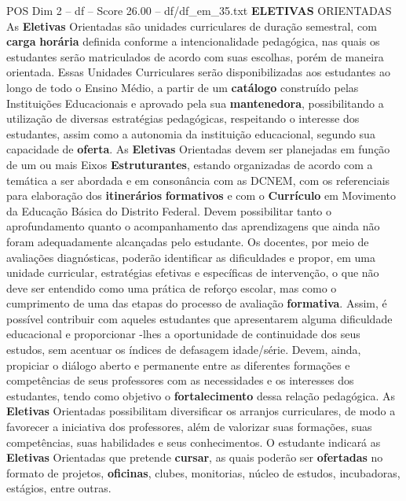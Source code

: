 \begin{textsample}{POS Dim 2 – df – Score 26.00 – df/df\_em\_35.txt}  \label{ex:f2_pos_122}
\textbf{ELETIVAS} ORIENTADAS As \textbf{Eletivas} Orientadas são unidades curriculares de duração semestral, com \textbf{carga} \textbf{horária} definida conforme a intencionalidade pedagógica, nas quais os estudantes serão matriculados de acordo com suas escolhas, porém de maneira orientada.
Essas Unidades Curriculares serão disponibilizadas aos estudantes ao longo de todo o Ensino Médio, a partir de um \textbf{catálogo} construído pelas Instituições Educacionais e aprovado pela sua \textbf{mantenedora}, possibilitando a utilização de diversas estratégias pedagógicas, respeitando o interesse dos estudantes, assim como a autonomia da instituição educacional, segundo sua capacidade de \textbf{oferta}.
As \textbf{Eletivas} Orientadas devem ser planejadas em função de um ou mais Eixos \textbf{Estruturantes}, estando organizadas de acordo com a temática a ser abordada e em consonância com as DCNEM, com os referenciais para elaboração dos \textbf{itinerários} \textbf{formativos} e com o \textbf{Currículo} em Movimento da Educação Básica do Distrito Federal.
Devem possibilitar tanto o aprofundamento quanto o acompanhamento das aprendizagens que ainda não foram adequadamente alcançadas pelo estudante.
Os docentes, por meio de avaliações diagnósticas, poderão identificar as dificuldades e propor, em uma unidade curricular, estratégias efetivas e específicas de intervenção, o que não deve ser entendido como uma prática de reforço escolar, mas como o cumprimento de uma das etapas do processo de avaliação \textbf{formativa}.
Assim, é possível contribuir com aqueles estudantes que apresentarem alguma dificuldade educacional e proporcionar -lhes a oportunidade de continuidade dos seus estudos, sem acentuar os índices de defasagem idade/série.
Devem, ainda, propiciar o diálogo aberto e permanente entre as diferentes formações e competências de seus professores com as necessidades e os interesses dos estudantes, tendo como objetivo o \textbf{fortalecimento} dessa relação pedagógica.
As \textbf{Eletivas} Orientadas possibilitam diversificar os arranjos curriculares, de modo a favorecer a iniciativa dos professores, além de valorizar suas formações, suas competências, suas habilidades e seus conhecimentos.
O estudante indicará as \textbf{Eletivas} Orientadas que pretende \textbf{cursar}, as quais poderão ser \textbf{ofertadas} no formato de projetos, \textbf{oficinas}, clubes, monitorias, núcleo de estudos, incubadoras, estágios, entre outras.

\end{textsample}
